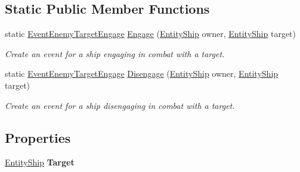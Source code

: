 \subsection*{Static Public Member Functions}
\begin{DoxyCompactItemize}
\item 
static \hyperlink{class_skyrates_1_1_client_1_1_game_1_1_event_1_1_event_enemy_target_engage}{Event\-Enemy\-Target\-Engage} \hyperlink{class_skyrates_1_1_client_1_1_game_1_1_event_1_1_event_enemy_target_engage_a2c9a3d7e5291e50292dd3d668b1e3ed8}{Engage} (\hyperlink{class_skyrates_1_1_client_1_1_entity_1_1_entity_ship}{Entity\-Ship} owner, \hyperlink{class_skyrates_1_1_client_1_1_entity_1_1_entity_ship}{Entity\-Ship} target)
\begin{DoxyCompactList}\small\item\em Create an event for a ship engaging in combat with a target. \end{DoxyCompactList}\item 
static \hyperlink{class_skyrates_1_1_client_1_1_game_1_1_event_1_1_event_enemy_target_engage}{Event\-Enemy\-Target\-Engage} \hyperlink{class_skyrates_1_1_client_1_1_game_1_1_event_1_1_event_enemy_target_engage_a6dc1bc49d58f7857a5ff22b3bc985a0b}{Disengage} (\hyperlink{class_skyrates_1_1_client_1_1_entity_1_1_entity_ship}{Entity\-Ship} owner, \hyperlink{class_skyrates_1_1_client_1_1_entity_1_1_entity_ship}{Entity\-Ship} target)
\begin{DoxyCompactList}\small\item\em Create an event for a ship disengaging in combat with a target. \end{DoxyCompactList}\end{DoxyCompactItemize}
\subsection*{Properties}
\begin{DoxyCompactItemize}
\item 
\hypertarget{class_skyrates_1_1_client_1_1_game_1_1_event_1_1_event_enemy_target_engage_aaf28e68334f06b5627cf0687f4314332}{\hyperlink{class_skyrates_1_1_client_1_1_entity_1_1_entity_ship}{Entity\-Ship} {\bfseries Target}}\label{class_skyrates_1_1_client_1_1_game_1_1_event_1_1_event_enemy_target_engage_aaf28e68334f06b5627cf0687f4314332}

\end{DoxyCompactItemize}
